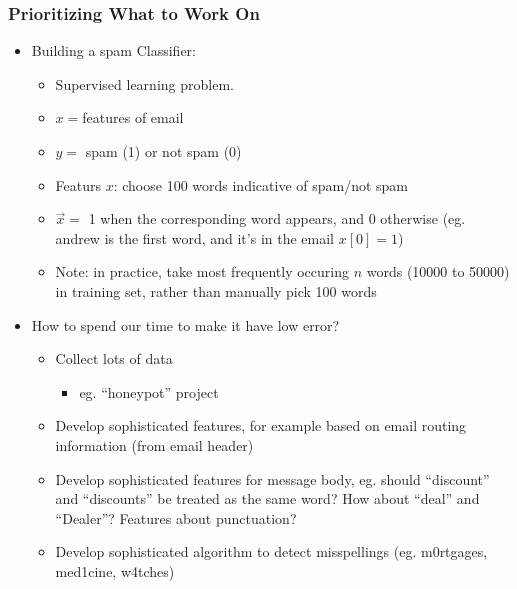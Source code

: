 \subsubsection{Prioritizing What to Work On}
\begin{itemize}[--]
	\item Building a spam Classifier:
	\begin{itemize}[--]
		\item Supervised learning problem.
		\item $x=$features of email
		\item $y=$ spam (1) or not spam (0)
		\item Featurs $x$: choose 100 words indicative of spam/not spam
		\item $\vec{x}=$ 1 when the corresponding word appears, and 0 otherwise (eg. andrew is the first word, and it's in the email $x\left[ 0\right]=1$)
		\item Note: in practice, take most frequently occuring $n$ words (10000 to 50000) in training set, rather than manually pick 100 words
	\end{itemize}

	\item How to spend our time to make it have low error?
	\begin{itemize}[--]
		\item Collect lots of data
		\begin{itemize}[--]
			\item eg. ``honeypot'' project
		\end{itemize}

		\item Develop sophisticated features, for example based on email routing information (from email header)
		\item Develop sophisticated features for message body, eg. should ``discount'' and ``discounts'' be treated as the same word? How about ``deal'' and ``Dealer''? Features about punctuation?
		\item Develop sophisticated algorithm to detect misspellings (eg. m0rtgages, med1cine, w4tches)
	\end{itemize}
\end{itemize}


